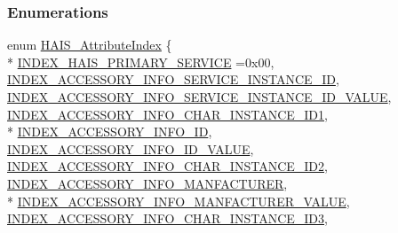 \subsubsection*{Enumerations}
\begin{DoxyCompactItemize}
\item 
enum \hyperlink{group___h_a_i_s_gaccb52c060db272fbfde92ca8e657cc4b}{H\+A\+I\+S\+\_\+\+Attribute\+Index} \{ \\*
\hyperlink{group___h_a_i_s_ggaccb52c060db272fbfde92ca8e657cc4ba992a1dbf9e5b8a4e68c5689503161882}{I\+N\+D\+E\+X\+\_\+\+H\+A\+I\+S\+\_\+\+P\+R\+I\+M\+A\+R\+Y\+\_\+\+S\+E\+R\+V\+I\+CE} =0x00, 
\hyperlink{group___h_a_i_s_ggaccb52c060db272fbfde92ca8e657cc4ba9eba8e4144959852d03a6473cf416f64}{I\+N\+D\+E\+X\+\_\+\+A\+C\+C\+E\+S\+S\+O\+R\+Y\+\_\+\+I\+N\+F\+O\+\_\+\+S\+E\+R\+V\+I\+C\+E\+\_\+\+I\+N\+S\+T\+A\+N\+C\+E\+\_\+\+ID}, 
\hyperlink{group___h_a_i_s_ggaccb52c060db272fbfde92ca8e657cc4bacf333ce5a1bea0878b763cb56849a523}{I\+N\+D\+E\+X\+\_\+\+A\+C\+C\+E\+S\+S\+O\+R\+Y\+\_\+\+I\+N\+F\+O\+\_\+\+S\+E\+R\+V\+I\+C\+E\+\_\+\+I\+N\+S\+T\+A\+N\+C\+E\+\_\+\+I\+D\+\_\+\+V\+A\+L\+UE}, 
\hyperlink{group___h_a_i_s_ggaccb52c060db272fbfde92ca8e657cc4ba05df452f19f0b6b0e56d1f52be001d6c}{I\+N\+D\+E\+X\+\_\+\+A\+C\+C\+E\+S\+S\+O\+R\+Y\+\_\+\+I\+N\+F\+O\+\_\+\+C\+H\+A\+R\+\_\+\+I\+N\+S\+T\+A\+N\+C\+E\+\_\+\+I\+D1}, 
\\*
\hyperlink{group___h_a_i_s_ggaccb52c060db272fbfde92ca8e657cc4ba9f6ea6b446940c860ca35b22e8102d63}{I\+N\+D\+E\+X\+\_\+\+A\+C\+C\+E\+S\+S\+O\+R\+Y\+\_\+\+I\+N\+F\+O\+\_\+\+ID}, 
\hyperlink{group___h_a_i_s_ggaccb52c060db272fbfde92ca8e657cc4ba66406c267d8ba351c185f28ce5868f71}{I\+N\+D\+E\+X\+\_\+\+A\+C\+C\+E\+S\+S\+O\+R\+Y\+\_\+\+I\+N\+F\+O\+\_\+\+I\+D\+\_\+\+V\+A\+L\+UE}, 
\hyperlink{group___h_a_i_s_ggaccb52c060db272fbfde92ca8e657cc4baa021a03490155400c7af1d9a9dcf5e79}{I\+N\+D\+E\+X\+\_\+\+A\+C\+C\+E\+S\+S\+O\+R\+Y\+\_\+\+I\+N\+F\+O\+\_\+\+C\+H\+A\+R\+\_\+\+I\+N\+S\+T\+A\+N\+C\+E\+\_\+\+I\+D2}, 
\hyperlink{group___h_a_i_s_ggaccb52c060db272fbfde92ca8e657cc4baee992cbc3a77678edecce85472fd0b72}{I\+N\+D\+E\+X\+\_\+\+A\+C\+C\+E\+S\+S\+O\+R\+Y\+\_\+\+I\+N\+F\+O\+\_\+\+M\+A\+N\+F\+A\+C\+T\+U\+R\+ER}, 
\\*
\hyperlink{group___h_a_i_s_ggaccb52c060db272fbfde92ca8e657cc4bac574bc845f122ef98576c5338ba3de78}{I\+N\+D\+E\+X\+\_\+\+A\+C\+C\+E\+S\+S\+O\+R\+Y\+\_\+\+I\+N\+F\+O\+\_\+\+M\+A\+N\+F\+A\+C\+T\+U\+R\+E\+R\+\_\+\+V\+A\+L\+UE}, 
\hyperlink{group___h_a_i_s_ggaccb52c060db272fbfde92ca8e657cc4ba3753a6782f951c155cdaf4906ea95666}{I\+N\+D\+E\+X\+\_\+\+A\+C\+C\+E\+S\+S\+O\+R\+Y\+\_\+\+I\+N\+F\+O\+\_\+\+C\+H\+A\+R\+\_\+\+I\+N\+S\+T\+A\+N\+C\+E\+\_\+\+I\+D3}, 

\end{DoxyCompactItemize}
